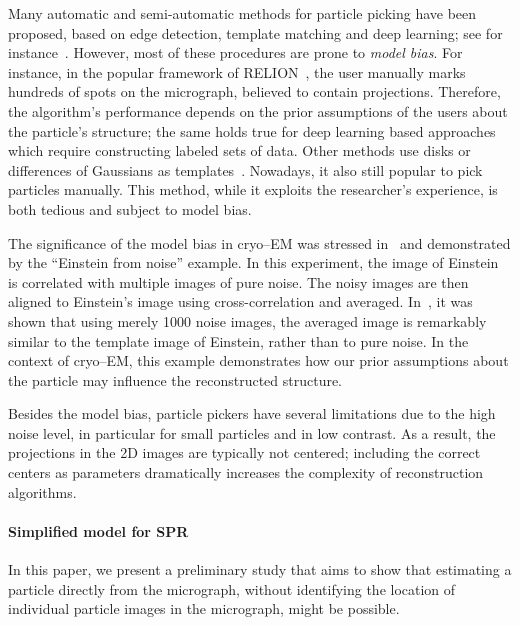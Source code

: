 \documentclass[english,11pt]{article}
\numberwithin{equation}{section}
\theoremstyle{plain}
\theoremstyle{definition}
\theoremstyle{remark}
\theoremstyle{plain}
\theoremstyle{remark}
\theoremstyle{plain}
\theoremstyle{plain}
\begin{document}
Many automatic and semi-automatic methods for particle picking have been proposed, based on edge detection, template matching and deep learning; see for instance~\cite{harauz1989automatic,ogura2004automatic,zhu2016deep,frank1983automatic,scheres2015semi,heimowitz2018apple}. 
However, most of these procedures are prone to \emph{model bias}. For instance, in the popular framework of RELION~\cite{scheres2015semi}, the user manually marks hundreds of spots on the micrograph, believed to contain projections. 
Therefore, the algorithm's performance depends on the prior assumptions of the users about the particle's structure; the same holds true for deep learning based approaches which require constructing labeled sets of data.
Other methods use disks or differences of Gaussians as templates~\cite{langlois2014automated,voss2009dog}.
Nowadays, it also still popular to pick particles manually. This method, while it exploits the researcher's experience, is both tedious and subject to model bias.

The significance of the model bias in cryo--EM was stressed in~\cite{shatsky2009method,henderson2013avoiding} and demonstrated by the ``Einstein from noise'' example.
In this experiment, the image of Einstein is correlated with multiple images of pure noise. The noisy images are then aligned to Einstein's image using cross-correlation and  averaged. 
In~\cite{shatsky2009method}, it was shown that using merely 1000 noise images, the averaged image is remarkably similar to the template image of 
Einstein, rather than to pure noise. 
In the context of cryo--EM, this example demonstrates how our prior assumptions about the particle may influence the reconstructed structure.

Besides the model bias, particle pickers have several limitations due to the high noise level, in particular for small particles and in low contrast. 
As a result, the projections in the 2D images are typically not centered; including the correct centers as parameters dramatically increases the complexity of reconstruction algorithms.

\paragraph{Simplified model for SPR} In this paper, we present a preliminary study that aims to show that estimating a particle 
directly from the micrograph, without identifying the location of individual particle images in the micrograph, might be possible. 
\end{document}
